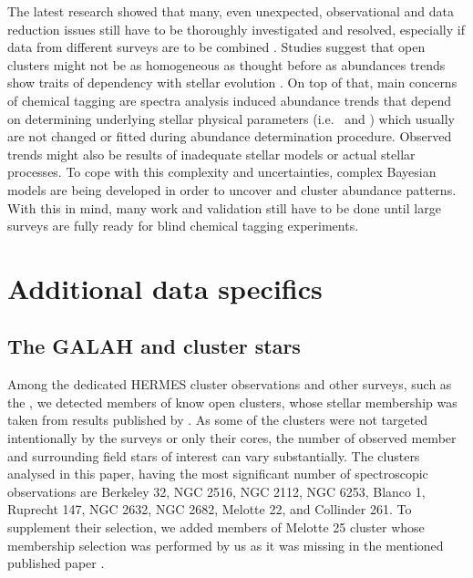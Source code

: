 The latest research showed that many, even unexpected, observational and data reduction issues still have to be thoroughly investigated and resolved, especially if data from different surveys are to be combined \citep{2019ARA&A..57..571J}. Studies suggest that open clusters might not be as homogeneous as thought before \citep{2016ApJ...817...49B, 2018MNRAS.473.4612K} as abundances trends show traits of dependency with stellar evolution \citep{2015A&A...577A..47B, 2017ApJ...840...99D, 2018MNRAS.478..425B, 2019A&A...627A.117L}. On top of that, main concerns of chemical tagging are spectra analysis induced abundance trends \citep{2016ApJ...817...49B, 2019arXiv191208539C, 2020arXiv200103179B} that depend on determining underlying stellar physical parameters (i.e. \Teff\ and \vsin) which usually are not changed or fitted during abundance determination procedure. Observed trends might also be results of inadequate stellar models or actual stellar processes. To cope with this complexity and uncertainties, complex Bayesian models are being developed \citep{2016ApJ...817...49B, 2019ApJ...887...73C} in order to uncover and cluster abundance patterns. With this in mind, many work and validation still have to be done until large surveys are fully ready for blind chemical tagging experiments. 

\section{Additional data specifics}
\label{sec:data_clusters}

\subsection{The GALAH and cluster stars}
\label{sec:galah_clusters}
Among the dedicated HERMES cluster observations and other surveys, such as the \Gh, we detected members of know open clusters, whose stellar membership was taken from results published by \citet{2018A&A...618A..93C}. As some of the clusters were not targeted intentionally by the surveys or only their cores, the number of observed member and surrounding field stars of interest can vary substantially. The clusters analysed in this paper, having the most significant number of spectroscopic observations are Berkeley 32, NGC 2516, NGC 2112, NGC 6253, Blanco 1, Ruprecht 147, NGC 2632, NGC 2682,  Melotte 22, and Collinder 261. To supplement their selection, we added members of Melotte 25 cluster whose membership selection was performed by us as it was missing in the mentioned published paper \cite{2018A&A...618A..93C}. 

